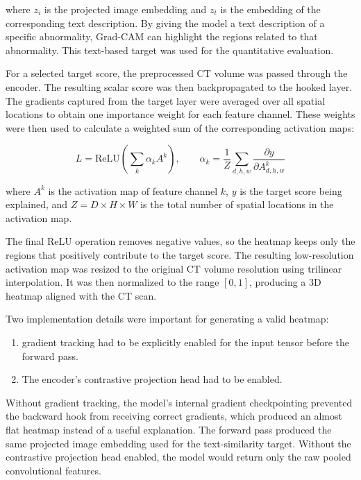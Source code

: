 \noindent where $z_i$ is the projected image embedding and $z_t$ is the
embedding of the corresponding text description. By giving the model a text
description of a specific abnormality, Grad-CAM can highlight the regions
related to that abnormality. This text-based target was used for the
quantitative evaluation.

For a selected target score, the preprocessed CT volume was passed through
the encoder. The resulting scalar score was
then backpropagated to the hooked layer. The gradients captured from the target layer
were averaged over all spatial locations to obtain one importance weight for
each feature channel. These weights were then used to calculate a weighted
sum of the corresponding activation maps:

\begin{equation}[Grad-CAM Heatmap]
L = \mathrm{ReLU}\left(\sum_{k} \alpha_{k} A^{k}\right), \qquad
\alpha_{k} = \frac{1}{Z}\sum_{d,h,w} \frac{\partial y}{\partial A_{d,h,w}^{k}}
\end{equation}

\noindent where $A^{k}$ is the activation map of feature channel $k$, $y$
is the target score being explained, and $Z = D \times H \times W$ is the total number of spatial locations in the
activation map.

The final ReLU operation removes negative values, so the
heatmap keeps only the regions that positively contribute to the target score.
The resulting low-resolution activation map was resized to the original CT
volume resolution using trilinear interpolation. It was then normalized to
the range $[0,1]$, producing a 3D heatmap aligned with the CT scan.

Two implementation details were important for generating a valid heatmap:
\begin{enumerate}
    \item gradient tracking had to be explicitly enabled for the input tensor before the forward pass.
    \item The encoder's contrastive projection head had to be enabled.
\end{enumerate}

Without gradient tracking, the model's internal gradient checkpointing prevented the backward hook from receiving correct
gradients, which produced an almost flat heatmap instead of a useful explanation.
The forward pass produced the same projected image embedding used for the
text-similarity target. Without the contrastive projection head enabled, the model would return only the raw
pooled convolutional features.

